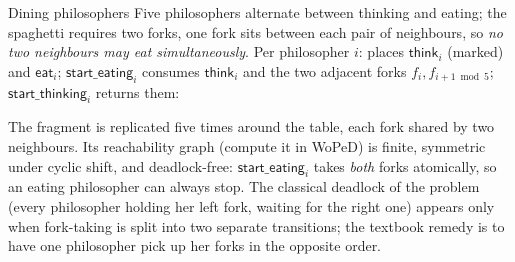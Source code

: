 \begin{examplebox}{Dining philosophers}
Five philosophers alternate between thinking and eating; the spaghetti requires two forks, one fork sits between each pair of neighbours, so \emph{no two neighbours may eat simultaneously}. Per philosopher $i$: places $\textsf{think}_i$ (marked) and $\textsf{eat}_i$; $\textsf{start\_eating}_i$ consumes $\textsf{think}_i$ and the two adjacent forks $f_i, f_{i+1 \bmod 5}$; $\textsf{start\_thinking}_i$ returns them:
\begin{center}
\end{center}
The fragment is replicated five times around the table, each fork shared by two neighbours. Its reachability graph (compute it in WoPeD) is finite, symmetric under cyclic shift, and deadlock-free: $\textsf{start\_eating}_i$ takes \emph{both} forks atomically, so an eating philosopher can always stop. The classical deadlock of the problem (every philosopher holding her left fork, waiting for the right one) appears only when fork-taking is split into two separate transitions; the textbook remedy is to have one philosopher pick up her forks in the opposite order.
\end{examplebox}


